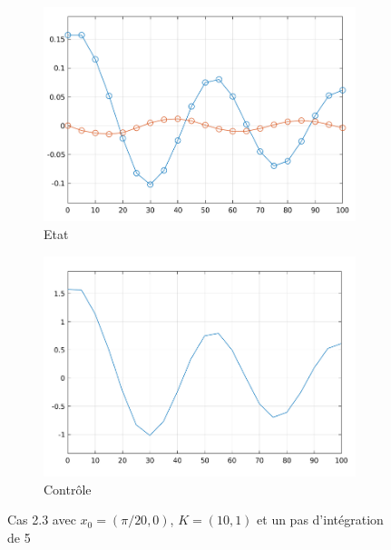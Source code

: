 \documentclass[a4paper]{article}
\begin{document}
                        \begin{figure}[h!]
                                \centering
                                \begin{subfigure}[b]{0.45\textwidth}
                                        \includegraphics[width=\textwidth]{images/courbe_cas_2_3_TP02.png}
                                        \caption{Etat}
                                        \label{fig3.4.1}
                                \end{subfigure}
                                \hspace{30pt}
                                \begin{subfigure}[b]{0.45\textwidth}
                                        \includegraphics[width=\textwidth]{images/controle_cas_2_3_TP02.png}
                                        \caption{Contrôle}
                                        \label{fig3.4.2}
                                \end{subfigure}
                                \caption{Cas 2.3 avec $x_0=(\pi/20, 0)$, $K=(10,1)$ et un pas d'intégration de 5}
                                \label{fig3.4}
                        \end{figure}
\end{document}
